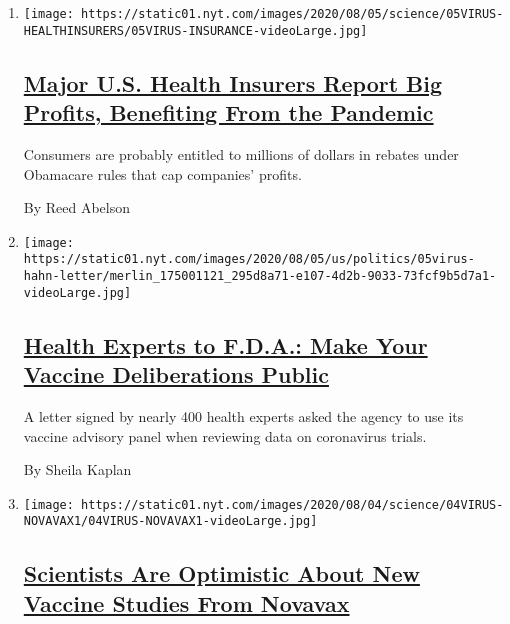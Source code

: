 \begin{enumerate}
\def\labelenumi{\arabic{enumi}.}
\item
  \texttt{[image: https://static01.nyt.com/images/2020/08/05/science/05VIRUS-HEALTHINSURERS/05VIRUS-INSURANCE-videoLarge.jpg]}

  \hypertarget{major-us-health-insurers-report-big-profits-benefiting-from-the-pandemic}{%
  \subsection{\texorpdfstring{\href{/2020/08/05/health/covid-insurance-profits.html}{Major
  U.S. Health Insurers Report Big Profits, Benefiting From the
  Pandemic}}{Major U.S. Health Insurers Report Big Profits, Benefiting From the Pandemic}}\label{major-us-health-insurers-report-big-profits-benefiting-from-the-pandemic}}

  Consumers are probably entitled to millions of dollars in rebates
  under Obamacare rules that cap companies' profits.

  By Reed Abelson
\item
  \texttt{[image: https://static01.nyt.com/images/2020/08/05/us/politics/05virus-hahn-letter/merlin\_175001121\_295d8a71-e107-4d2b-9033-73fcf9b5d7a1-videoLarge.jpg]}

  \hypertarget{health-experts-to-fda-make-your-vaccine-deliberations-public}{%
  \subsection{\texorpdfstring{\href{/2020/08/05/health/covid-19-vaccine-fda.html}{Health
  Experts to F.D.A.: Make Your Vaccine Deliberations
  Public}}{Health Experts to F.D.A.: Make Your Vaccine Deliberations Public}}\label{health-experts-to-fda-make-your-vaccine-deliberations-public}}

  A letter signed by nearly 400 health experts asked the agency to use
  its vaccine advisory panel when reviewing data on coronavirus trials.

  By Sheila Kaplan
\item
  \texttt{[image: https://static01.nyt.com/images/2020/08/04/science/04VIRUS-NOVAVAX1/04VIRUS-NOVAVAX1-videoLarge.jpg]}

  \hypertarget{scientists-are-optimistic-about-new-vaccine-studies-from-novavax}{%
  \subsection{\texorpdfstring{\href{/2020/08/04/health/covid-19-vaccine-novavax.html}{Scientists
  Are Optimistic About New Vaccine Studies From
  Novavax}}{Scientists Are Optimistic About New Vaccine Studies From Novavax}}\label{scientists-are-optimistic-about-new-vaccine-studies-from-novavax}}


\end{enumerate}
